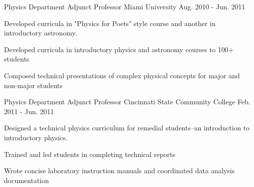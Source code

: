 \begin{cventries}
  \cventry
    {Physics Department} %
    {Adjunct Professor} %
    {Miami University} %
    {Aug. 2010 - Jun. 2011} %
    {
      \begin{cvparagraph}
        Developed curricula in "Physics for Poets" style course and another in introductory astronomy.  
      \end{cvparagraph}
      \begin{cvitems} %
        \item {Developed curricula in introductory physics and astronomy courses to 100+ students}
        \item {Composed technical presentations of complex physical concepts for major and non-major students}
      \end{cvitems}
    }

  \cventry
    {Physics Department} %
    {Adjunct Professor} %
    {Cincinnati State Community College} %
    {Feb. 2011 - Jun. 2011} %
    {
      \begin{cvparagraph}
        Designed a technical physics curriculum for remedial students--an introduction to introductory physics.
      \end{cvparagraph}
      \begin{cvitems} %
        \item {Trained and led students in completing technical reports}
        \item {Wrote concise laboratory instruction manuals and coordinated data analysis documentation}
      \end{cvitems}
    }

\end{cventries}
